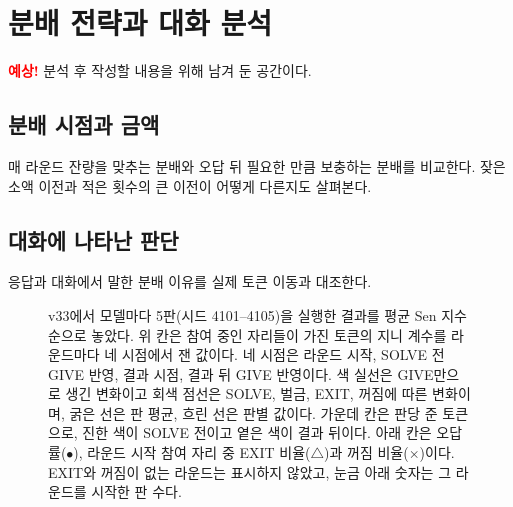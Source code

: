 \section{분배 전략과 대화 분석}\label{sec:strategies}

\noindent\textcolor{red}{\textbf{예상!}} 분석 후 작성할 내용을 위해 남겨 둔 공간이다.

\subsection{분배 시점과 금액}

매 라운드 잔량을 맞추는 분배와 오답 뒤 필요한 만큼 보충하는 분배를 비교한다.
잦은 소액 이전과 적은 횟수의 큰 이전이 어떻게 다른지도 살펴본다.

\subsection{대화에 나타난 판단}

응답과 대화에서 말한 분배 이유를 실제 토큰 이동과 대조한다.

\begin{figure}[t]
\centering
\resizebox{\textwidth}{!}{}
\caption{v33에서 모델마다 5판(시드 4101--4105)을 실행한 결과를 평균 Sen 지수 순으로 놓았다. 위 칸은 참여 중인 자리들이 가진 토큰의 지니 계수를 라운드마다 네 시점에서 잰 값이다. 네 시점은 라운드 시작, SOLVE 전 GIVE 반영, 결과 시점, 결과 뒤 GIVE 반영이다. 색 실선은 GIVE만으로 생긴 변화이고 회색 점선은 SOLVE, 벌금, EXIT, 꺼짐에 따른 변화이며, 굵은 선은 판 평균, 흐린 선은 판별 값이다. 가운데 칸은 판당 준 토큰으로, 진한 색이 SOLVE 전이고 옅은 색이 결과 뒤이다. 아래 칸은 오답률($\bullet$), 라운드 시작 참여 자리 중 EXIT 비율($\triangle$)과 꺼짐 비율($\times$)이다. EXIT와 꺼짐이 없는 라운드는 표시하지 않았고, 눈금 아래 숫자는 그 라운드를 시작한 판 수다.}
\label{fig:arena-gini}
\end{figure}
